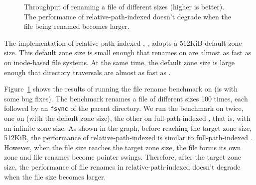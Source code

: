 \begin{figure}[t]
    \centering
    \caption[The performance of file renames in relative-path-indexed file systems]{\label{fig:file_rename_rpi}
        Throughput of renaming a file of different sizes (higher is better).
        The performance of relative-path-indexed \betrfsThree doesn't
        degrade when the file being renamed becomes larger.}
\end{figure}

The implementation of relative-path-indexed \betrfs, \betrfsTwo, adopts a
512KiB default zone size.
This default zone size is small enough that renames on \betrfsTwo are almost
as fast as on inode-based file systems.
At the same time, the default zone size is large enough that directory
traversals are almost as fast as \betrfsOne.

Figure~\ref{fig:file_rename_rpi} shows the results of running the file rename
benchmark on \betrfsThree (\betrfsThree is \betrfsTwo with some bug fixes).
The benchmark renames a file of different sizes 100 times, each followed by an
\texttt{fsync} of the parent directory.
We run the benchmark on \betrfsThree twice,
one on \betrfsThree (with the default zone size),
the other on full-path-indexed \betrfsThree,
that is, \betrfsThree with an infinite zone size.
As shown in the graph, before reaching the target zone size, 512KiB,
the performance of relative-path-indexed \betrfsThree is similar to
full-path-indexed \betrfsThree.
However, when the file size reaches the target zone size, the file forms its
own zone and file renames become pointer swings.
Therefore, after the target zone size,
the performance of file renames in relative-path-indexed \betrfsThree
doesn't degrade when the file size becomes larger.


